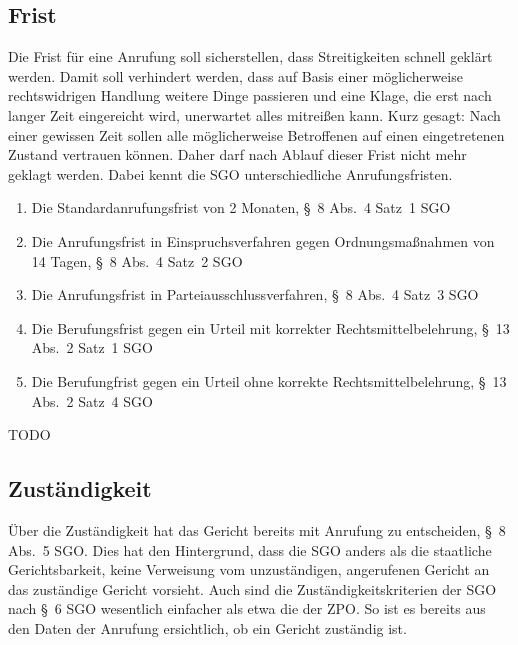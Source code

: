 \subsection{Frist}
\label{Standardworkflow:Frist}
Die Frist für eine Anrufung soll sicherstellen, dass Streitigkeiten schnell geklärt werden.
Damit soll verhindert werden, dass auf Basis einer möglicherweise rechtswidrigen Handlung weitere Dinge passieren und eine Klage, die erst nach langer Zeit eingereicht wird, unerwartet alles mitreißen kann.
Kurz gesagt: Nach einer gewissen Zeit sollen alle möglicherweise Betroffenen auf einen eingetretenen Zustand vertrauen können.
Daher darf nach Ablauf dieser Frist nicht mehr geklagt werden.
Dabei kennt die SGO unterschiedliche Anrufungsfristen.
\begin{enumerate}
\item Die Standardanrufungsfrist von 2 Monaten, \S~8 Abs.~4 Satz~1 SGO
\item Die Anrufungsfrist in Einspruchsverfahren gegen Ordnungsmaßnahmen von 14 Tagen, \S~8 Abs.~4 Satz~2 SGO
\item Die Anrufungsfrist in Parteiausschlussverfahren, \S~8 Abs.~4 Satz~3 SGO
\item Die Berufungsfrist gegen ein Urteil mit korrekter Rechtsmittelbelehrung, \S~13 Abs.~2 Satz~1 SGO
\item Die Berufungfrist gegen ein Urteil ohne korrekte Rechtsmittelbelehrung, \S~13 Abs.~2 Satz~4 SGO
\end{enumerate}

TODO

\subsection{Zuständigkeit}
\label{Standardworkflow:Zustaendigkeit}
Über die Zuständigkeit hat das Gericht bereits mit Anrufung zu entscheiden, \S~8 Abs.~5 SGO.
Dies hat den Hintergrund, dass die SGO anders als die staatliche Gerichtsbarkeit, keine Verweisung vom unzuständigen, angerufenen Gericht an das zuständige Gericht vorsieht.
Auch sind die Zuständigkeitskriterien der SGO nach \S~6 SGO wesentlich einfacher als etwa die der ZPO.
So ist es bereits aus den Daten der Anrufung ersichtlich, ob ein Gericht zuständig ist.


